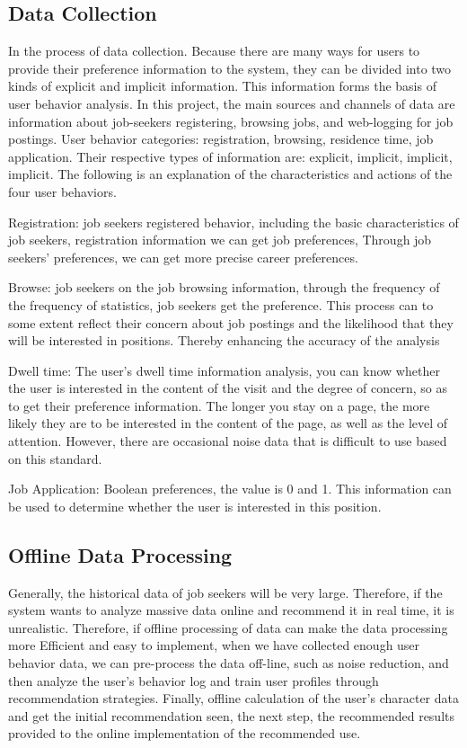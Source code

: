 \documentclass[sigconf]{acmart}
\begin{document}
\subsection{Data Collection}
In the process of data collection. Because there are many ways for users to provide their preference information to the system, they can be divided into two kinds of explicit and implicit information.\cite{Hong2013}  This information forms the basis of user behavior analysis. In this project, the main sources and channels of data are information about job-seekers registering, browsing jobs, and web-logging for job postings. User behavior categories: registration, browsing, residence time, job application.\cite{Hong2013}  Their respective types of information are: explicit, implicit, implicit, implicit. The following is an explanation of the characteristics and actions of the four user behaviors.
\par Registration: job seekers registered behavior, including the basic characteristics of job seekers, registration information we can get job preferences,
Through job seekers' preferences, we can get more precise career preferences.
\par Browse: job seekers on the job browsing information, through the frequency of the frequency of statistics, job seekers get the preference. This process can to some extent reflect their concern about job postings and the likelihood that they will be interested in positions. Thereby enhancing the accuracy of the analysis
\par Dwell time: The user's dwell time information analysis, you can know whether the user is interested in the content of the visit and the degree of concern, so as to get their preference information. The longer you stay on a page, the more likely they are to be interested in the content of the page, as well as the level of attention. However, there are occasional noise data that is difficult to use based on this standard.
\par Job Application: Boolean preferences, the value is 0 and 1. This information can be used to determine whether the user is interested in this position.

\subsection{Offline Data Processing}
Generally, the historical data of job seekers will be very large. Therefore, if the system wants to analyze massive data online and recommend it in real time, it is unrealistic. Therefore, if offline processing of data can make the data processing more Efficient and easy to implement, when we have collected enough user behavior data, we can pre-process the data off-line, such as noise reduction, and then analyze the user's behavior log and train user profiles through recommendation strategies.\cite{Hong2013}  Finally, offline calculation of the user's character data and get the initial recommendation seen, the next step, the recommended results provided to the online implementation of the recommended use.
\end{document}
